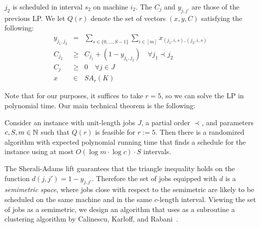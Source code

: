 $j_2$ is scheduled in interval $s_2$ on machine $i_2$. 
The $C_j$ and $y_{j,j'}$ are those of the previous LP.
We let $Q(r)$ denote the set of vectors $(x,y,C)$ satisfying the following:
\begin{eqnarray*}
  y_{j_1,j_2} &=& \sum_{s \in \{ 0,\ldots,S-1\}} \sum_{i \in [m]} x_{(j_1,i,s),(j_2,i,s)} \\
  C_{j_2} &\geq& C_{j_1} + (1-y_{j_1,j_2}) \quad \forall j_1 \prec j_2 \\
  C_j &\geq& 0 \quad \forall j \in J \\ 
  x &\in& SA_r(K)
\end{eqnarray*}

Note that for our purposes, it suffices to take $r=5$, so we can solve the LP in polynomial time.
Our main technical theorem is the following:
\begin{theorem}\label{thm: main_sched1_intro}
Consider an instance with unit-length jobs $J$, a partial order $\prec$, and parameters $c,S,m \in \mathbb{N}$ such that
  $Q(r)$ is feasible for $r:=5$. Then there is a randomized algorithm with expected polynomial running time that finds a
   schedule for the instance using at most $O(\log m \cdot \log c) \cdot S$ intervals.
\end{theorem}
The Sherali-Adams lift guarantees that the triangle inequality holds on the function $d(j,j') =1-y_{j,j'}$. 
Therefore the set of jobs equipped with $d$ is a \emph{semimetric space}, where jobs close with respect to the semimetric are likely to be scheduled on the same machine
 and in the same $c$-length interval.
Viewing the set of jobs as a semimetric, we design an algorithm that uses as a subroutine
a clustering algorithm by Calinescu, Karloff, and Rabani~\cite{DBLP:journals/siamcomp/CalinescuKR04}.

